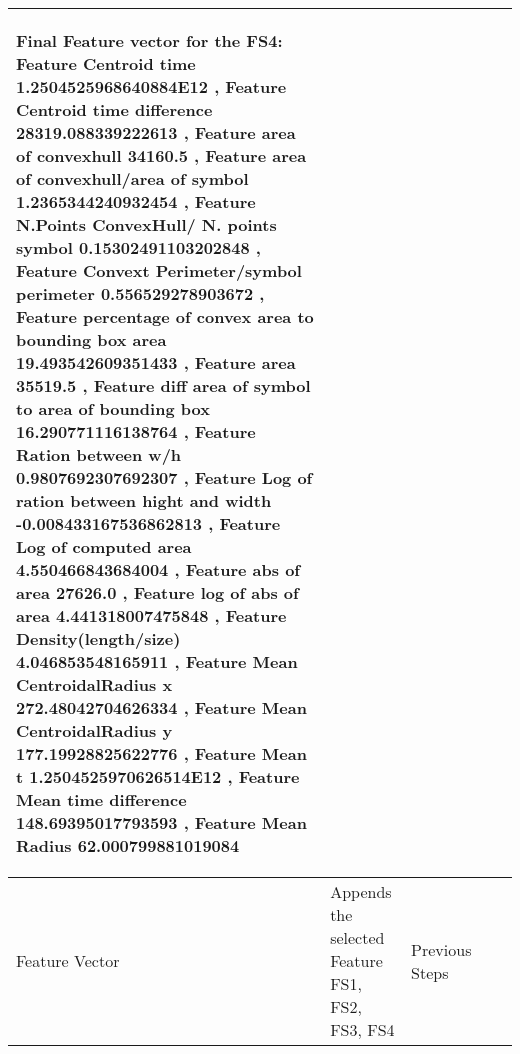 \begin{landscape}
\begin{scriptsize}
\begin{longtable}{|p{2cm}|p{2cm}|p{2cm}|p{2cm}|p{13cm}|}
\begin{scriptsize}
Final Feature vector for the FS4: 
  Feature Centroid time 1.2504525968640884E12  , Feature Centroid time difference 28319.088339222613   ,    Feature area of convexhull 34160.5   ,    Feature area of convexhull/area of symbol 1.2365344240932454   ,    Feature N.Points ConvexHull/ N. points symbol 0.15302491103202848   ,    Feature Convext Perimeter/symbol perimeter 0.556529278903672   ,    Feature  percentage of convex area to bounding box area 19.493542609351433   ,    Feature area  35519.5   ,    Feature diff area of symbol to area of bounding box 16.290771116138764   ,    Feature  Ration between w/h  0.9807692307692307   ,    Feature  Log of ration between hight and width -0.008433167536862813   , 
 Feature  Log of computed area 4.550466843684004   ,    Feature  abs of area 27626.0   ,    Feature log of  abs of area 4.441318007475848   ,    Feature  Density(length/size)  4.046853548165911   ,    Feature Mean CentroidalRadius x 272.48042704626334   ,    Feature Mean CentroidalRadius y 177.19928825622776   ,    Feature Mean t 1.2504525970626514E12   ,    Feature Mean time difference 148.69395017793593   ,    Feature Mean Radius 62.000799881019084   
  \end{scriptsize}
    \\ \hline
 Feature Vector & Appends the selected Feature FS1, FS2, FS3, FS4 & Previous Steps  & & 
 

\end{longtable}
\end{scriptsize}
\end{landscape}
